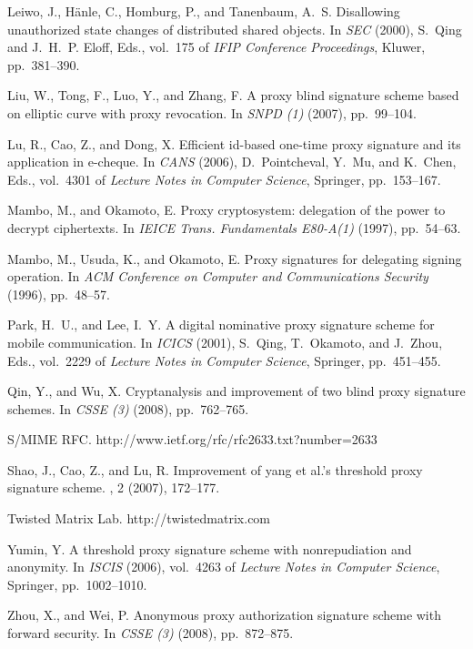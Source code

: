 \documentclass{sig-alternate}
\begin{document}
\begin{thebibliography}{10}
{\sc Leiwo, J., H{\"a}nle, C., Homburg, P., and Tanenbaum, A.~S.}
\newblock Disallowing unauthorized state changes of distributed shared objects.
\newblock In {\em SEC\/} (2000), S.~Qing and J.~H.~P. Eloff, Eds., vol.~175 of
{\em IFIP Conference Proceedings}, Kluwer, pp.~381--390.

{\sc Liu, W., Tong, F., Luo, Y., and Zhang, F.}
\newblock A proxy blind signature scheme based on elliptic curve with proxy
revocation.
\newblock In {\em SNPD (1)\/} (2007), pp.~99--104.

{\sc Lu, R., Cao, Z., and Dong, X.}
\newblock Efficient id-based one-time proxy signature and its application in
e-cheque.
\newblock In {\em CANS\/} (2006), D.~Pointcheval, Y.~Mu, and K.~Chen, Eds.,
vol.~4301 of {\em Lecture Notes in Computer Science}, Springer, pp.~153--167.

{\sc Mambo, M., and Okamoto, E.}
\newblock Proxy cryptosystem: delegation of the power to decrypt ciphertexts.
\newblock In {\em IEICE Trans. Fundamentals E80-A(1)\/} (1997), pp.~54--63.

{\sc Mambo, M., Usuda, K., and Okamoto, E.}
\newblock Proxy signatures for delegating signing operation.
\newblock In {\em ACM Conference on Computer and Communications Security\/}
(1996), pp.~48--57.

{\sc Park, H.~U., and Lee, I.~Y.}
\newblock A digital nominative proxy signature scheme for mobile communication.
\newblock In {\em ICICS\/} (2001), S.~Qing, T.~Okamoto, and J.~Zhou, Eds.,
vol.~2229 of {\em Lecture Notes in Computer Science}, Springer, pp.~451--455.

{\sc Qin, Y., and Wu, X.}
\newblock Cryptanalysis and improvement of two blind proxy signature schemes.
\newblock In {\em CSSE (3)\/} (2008), pp.~762--765.

{\sc S/MIME RFC}.
\newblock http://www.ietf.org/rfc/rfc2633.txt?number=2633

{\sc Shao, J., Cao, Z., and Lu, R.}
\newblock Improvement of yang et al.'s threshold proxy signature scheme.
, 2 (2007), 172--177.


{\sc Twisted Matrix Lab}.
\newblock http://twistedmatrix.com

{\sc Yumin, Y.}
\newblock A threshold proxy signature scheme with nonrepudiation and anonymity.
\newblock In {\em ISCIS\/} (2006), vol.~4263 of {\em Lecture Notes in Computer
Science}, Springer, pp.~1002--1010.



{\sc Zhou, X., and Wei, P.}
\newblock Anonymous proxy authorization signature scheme with forward security.
\newblock In {\em CSSE (3)\/} (2008), pp.~872--875.

\end{thebibliography}
\end{document}
